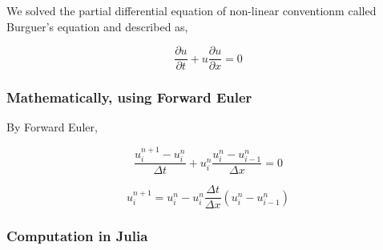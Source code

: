 \documentclass[11pt]{article}
\begin{document}
We solved the partial differential equation of non-linear conventionm
called Burguer's equation and described as,

$$\frac{\partial u}{\partial t} + u \frac{\partial u}{\partial x} =
0$$

\subsubsection{Mathematically, using Forward Euler}
\label{sec:orge2d8a08}

By Forward Euler,

$$\frac{u_i^{n+1}-u_i^n}{\Delta t} + u_i^n \frac{u_i^n-u_{i-1}^n}{\Delta x} = 0$$

$$u_i^{n+1} = u_i^n - u_i^n \frac{\Delta t}{\Delta x} (u_i^n - u_{i-1}^n)$$

\subsubsection{Computation in Julia}
\label{sec:org2e5b517}
\end{document}
